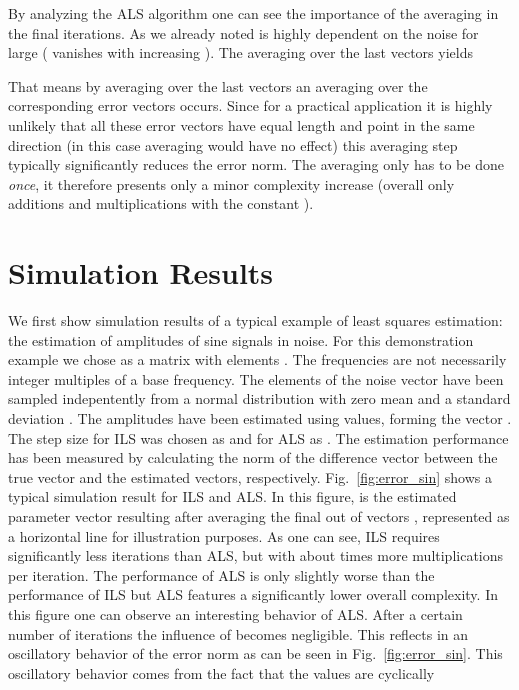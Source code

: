 \documentclass{article}
\begin{document}
By analyzing the ALS algorithm one can see the importance of the averaging 
in the final  iterations. 
As we already noted  is highly dependent on the noise for large  (
vanishes with increasing ). 
The averaging over the last  vectors yields


That means by averaging over the last  vectors  an averaging 
over the 
corresponding error vectors occurs.
Since for a practical application it is highly unlikely that all these error vectors 
have equal length and 
point in the same direction
(in this case averaging would have no effect) this averaging step typically 
significantly reduces the error norm.
The averaging only has to be done \emph{once}, it therefore presents only a minor 
complexity 
increase (overall only  additions and  multiplications with the constant 
).

\section{Simulation Results} \label{sec:sim_res} 
We first show simulation results of a typical example of least squares estimation: the estimation
of amplitudes of sine signals in noise. For this demonstration example we 
chose  as a  matrix 
with elements .
The frequencies  are not necessarily integer multiples of a base frequency.
The elements of the noise vector have been 
sampled indepentently from a normal distribution with zero mean and a 
standard deviation . 
The amplitudes  
have been estimated using  values, forming the vector . 
The step size for ILS was chosen as  and
for ALS as .
The estimation performance
has been measured by calculating the norm of the difference vector 
between the true vector  and the estimated vectors, respectively. Fig.~\ref{fig:error_sin}
shows a typical simulation result for ILS and ALS. 
In this figure,  is the estimated parameter vector resulting 
after averaging the 
final  out of  vectors , represented as a horizontal line for 
illustration purposes.
As one can see, ILS requires significantly less
iterations than ALS, but with about  times more multiplications per iteration. 
The
performance of ALS is only slightly worse than the performance of ILS
but ALS features a significantly lower overall complexity. 
In this figure one can observe an interesting behavior of ALS. After a certain number of iterations 
the influence of  becomes negligible. 
This reflects in an oscillatory behavior 
of the error norm as can be seen in Fig.~\ref{fig:error_sin}.
This oscillatory behavior comes from the fact that the values  are cyclically 
\end{document}
